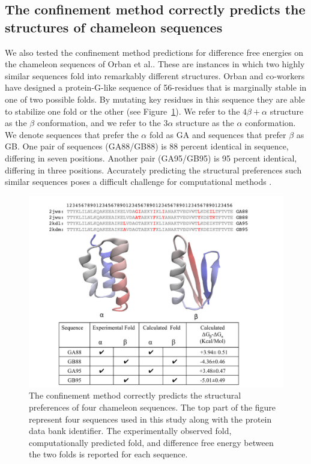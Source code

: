 \documentclass[12pt]{article}
\begin{document}
\subsection*{The confinement method correctly predicts the structures of chameleon sequences}

We also tested the confinement method predictions for difference free energies on the chameleon sequences of Orban et
al.\cite{Alexander2007,He2008,Alexander2009,Bryan2010,He2012}. These are instances in which two highly similar sequences
fold into remarkably different structures. Orban and co-workers have designed a protein-G-like sequence of 56-residues
that is marginally stable in one of two possible folds. By mutating key residues in this sequence they are able to
stabilize one fold or the other (see Figure~\ref{fig:orban}). We refer to the $4\beta + \alpha$ structure as the $\beta$
conformation, and we refer to the $3\alpha$ structure as the $\alpha$ conformation. We denote sequences that prefer the
$\alpha$ fold as GA and sequences that prefer $\beta$ as GB. One pair of sequences (GA88/GB88) is 88 percent identical
in sequence, differing in seven positions. Another pair (GA95/GB95) is 95 percent identical, differing in three
positions. Accurately predicting the structural preferences such similar sequences poses a difficult challenge for
computational methods \cite{Allison2011}.

\begin{figure}
    \begin{center}
    \includegraphics[width=5.0in]{orban.pdf}
    \end{center}
    \caption{The confinement method correctly predicts the structural preferences of four chameleon sequences. The top
        part of the figure represent four sequences used in this study along with the protein data bank identifier. The
        experimentally observed fold, computationally predicted fold, and difference free energy between the two folds
        is reported for each sequence.}
\label{fig:orban}
\end{figure}
\end{document}
